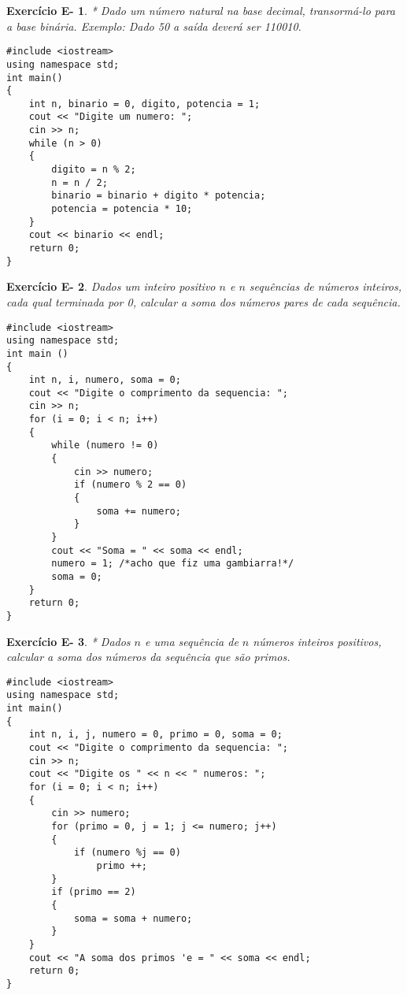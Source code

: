 \documentclass[a4paper]{article}
\newtheorem{eex}{Exerc\'icio E-}
\begin{document}
\begin{eex}
* Dado um n\'umero natural na base decimal, transormá-lo para a base binária. Exemplo: Dado 50 a saída deverá ser 110010.
\end{eex}

\begin{lstlisting}
#include <iostream>
using namespace std;
int main()
{
    int n, binario = 0, digito, potencia = 1;
    cout << "Digite um numero: ";
    cin >> n;
    while (n > 0)
    {
        digito = n % 2;
        n = n / 2;
        binario = binario + digito * potencia;
        potencia = potencia * 10;
    }
    cout << binario << endl;
    return 0;
} 
\end{lstlisting}

\begin{eex}
Dados um inteiro positivo $n$ e $n$ sequ\^encias de números inteiros, cada qual terminada por 0, calcular a soma dos números pares de cada sequ\^encia.
\end{eex}

\begin{lstlisting}
#include <iostream>
using namespace std;
int main ()
{
    int n, i, numero, soma = 0;
    cout << "Digite o comprimento da sequencia: ";
    cin >> n;
    for (i = 0; i < n; i++)
    {
        while (numero != 0)
        {
            cin >> numero;
            if (numero % 2 == 0)
            {
                soma += numero;
            }
        }
        cout << "Soma = " << soma << endl;
        numero = 1; /*acho que fiz uma gambiarra!*/
        soma = 0;
    }
    return 0;
}
\end{lstlisting}

\begin{eex}
* Dados $n$ e uma sequ\^encia de $n$ números inteiros positivos, calcular a soma dos números da sequ\^encia que s\~ao primos.
\end{eex}

\begin{lstlisting}
#include <iostream>
using namespace std;
int main()
{
    int n, i, j, numero = 0, primo = 0, soma = 0;
    cout << "Digite o comprimento da sequencia: ";
    cin >> n;
    cout << "Digite os " << n << " numeros: ";
    for (i = 0; i < n; i++)
    {
        cin >> numero;
        for (primo = 0, j = 1; j <= numero; j++)
        {
            if (numero %j == 0)
                primo ++;
        }
        if (primo == 2)
        {
            soma = soma + numero;
        }
    }
    cout << "A soma dos primos 'e = " << soma << endl;
    return 0;
}
\end{lstlisting}
\end{document}
